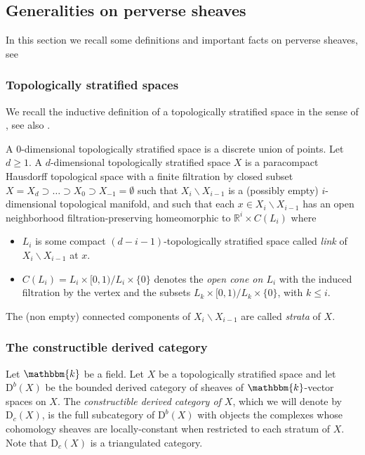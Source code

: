 \documentclass[11pt]{amsart}
\theoremstyle{definition}
\newcommand{\R}{\mathbb{R}}
\newcommand{\kk}{\mathbbm{k}}
\newcommand{\cat}[1]{\mathrm{#1}}
\newcommand{\constr}[2]{\cat{D}_{#1}({#2})}
\newcommand{\der}[2]{\cat{D}^{#1}({#2})}
\begin{document}
\subsection{Generalities on perverse sheaves}

In this section we recall some definitions and important facts on perverse sheaves, see \cite{BBD, gm2}

\subsubsection{Topologically stratified spaces}
 We recall the inductive definition of a topologically stratified space in the sense of \cite{gm2}, see also \cite[Definition 4.1.1]{KW}.
 
 A 0-dimensional topologically stratified space is a discrete union of points. Let $d\geq1$. A $d$-dimensional topologically stratified space $X$ is a paracompact Hausdorff topological space with a finite filtration by closed subset $X=X_d\supset \ldots \supset X_0\supset X_{-1}=\emptyset$ such that $X_i \smallsetminus X_{i-1}$ is a (possibly empty) $i$-dimensional topological manifold, and such that each $x\in X_i \smallsetminus X_{i-1}$ has an open neighborhood filtration-preserving homeomorphic to $\R^i\times C(L_i)$ where 
 \begin{itemize}
     \item $L_i$ is some compact $(d-i-1)$-topologically stratified space called {\em link} of $X_i\smallsetminus X_{i-1}$ at $x$.
     \item $C(L_i) = L_i \times [0, 1)/L_i \times\{0\}$ denotes the {\em open cone on $L_i$} with the induced filtration by the vertex and the subsets $L_k \times[0, 1)/L_k \times\{0\}$, with $k\leq i$.
 \end{itemize}
 The (non empty) connected components of $X_{i}\smallsetminus X_{i-1}$ are called {\em strata} of $X$.

\subsubsection{The constructible derived category}

Let $\kk$ be a field. Let $X$ be a topologically stratified space and let $\der{b}{X}$ be the bounded derived category of sheaves of $\kk$-vector spaces on $X$. The {\em constructible derived category of $X$}, which we will denote by $\constr{c}{X}$, is the full subcategory of $\der{b}{X}$ with objects the complexes whose cohomology sheaves are locally-constant when restricted to each stratum of $X$. Note that $\constr{c}{X}$ is a triangulated category.
\end{document}
